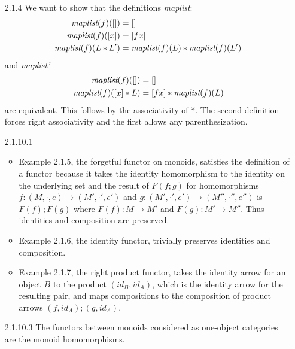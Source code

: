 \documentclass{article}
\begin{document}
\begin{enumerate}
\item[2.1.4]
  We want to show that the definitions \emph{maplist}:
  \begin{align*}
     \emph{maplist}(f)([]) &= []
  \\ \emph{maplist}(f)([x]) &= [f x]
  \\ \emph{maplist}(f)(L * L') &= \emph{maplist}(f)(L) * \emph{maplist}(f)(L')
  \end{align*}
  and \emph{maplist'}
  \begin{align*}
     \emph{maplist}(f)([]) &= []
  \\ \emph{maplist}(f)([x] * L) &= [f x] * \emph{maplist}(f)(L)
  \end{align*}
  are equivalent.
  This follows by the associativity of *.
  The second definition forces right associativity and the first allows any parenthesization.

\item[2.1.10.1]
\begin{itemize}
\item Example 2.1.5, the forgetful functor on monoids, satisfies the definition of a functor because it takes the identity homomorphism to the identity on the underlying set and the result of $F (f;g)$ for homomorphisms $f : (M,\cdot,e) \rightarrow (M',\cdot',e')$ and $g : (M',\cdot', e') \rightarrow (M'',\cdot'',e'')$ is $F(f); F(g)$ where $F(f) : M \rightarrow M'$ and $F(g) : M' \rightarrow M''$. 
Thus identities and composition are preserved.
\item Example 2.1.6, the identity functor, trivially preserves identities and composition.
\item Example 2.1.7, the right product functor, takes the identity arrow for an object $B$ to the product $(id_B, id_A)$, which is the identity arrow for the resulting pair, and maps compositions to the composition of product arrows $(f,id_A); (g,id_A)$.
\end{itemize}

\item[2.1.10.3] The functors between monoids considered as one-object categories are the monoid homomorphisms.
\end{enumerate}
\end{document}
